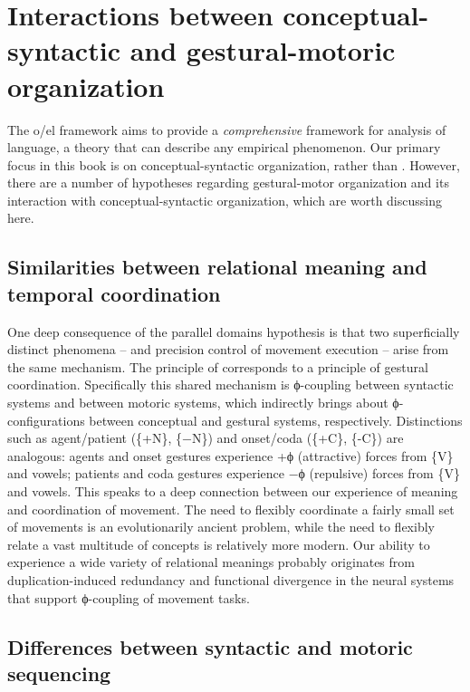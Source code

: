 \section{Interactions between conceptual-syntactic and gestural-motoric organization}

The o/el framework aims to provide a \textit{comprehensive} framework for analysis of language, a theory that can describe any empirical phenomenon. Our primary focus in this book is on conceptual-syntactic organization, rather than . However, there are a number of hypotheses regarding gestural-motor organization and its interaction with conceptual-syntactic organization, which are worth discussing here.

\subsection{Similarities between relational meaning and temporal coordination}

One deep consequence of the parallel domains hypothesis is that two superficially distinct phenomena --  and precision control of movement execution -- arise from the same mechanism. The principle of  corresponds to a principle of gestural coordination. Specifically this shared mechanism is ϕ-coupling between syntactic systems and between motoric systems, which indirectly brings about ϕ-configurations between conceptual and gestural systems, respectively. Distinctions such as agent/patient (\{+N\}, \{−N\}) and onset/coda (\{+C\}, \{-C\}) are analogous: agents and onset gestures experience +ϕ (attractive) forces from \{V\} and vowels; patients and coda gestures experience −ϕ (repulsive) forces from \{V\} and vowels. This speaks to a deep connection between our experience of meaning and coordination of movement. The need to flexibly coordinate a fairly small set of movements is an evolutionarily ancient problem, while the need to flexibly relate a vast multitude of concepts is relatively more modern. Our ability to experience a wide variety of relational meanings probably originates from duplication-induced redundancy and functional divergence in the neural systems that support ϕ-coupling of movement tasks. 

\subsection{Differences between syntactic and motoric sequencing} 

